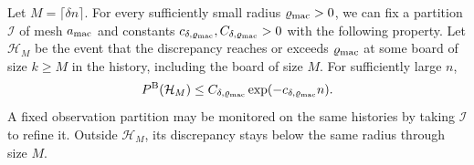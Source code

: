 \begin{proposicion}\label{macro:parada}
Let $M=\lceil\delta n\rceil$. For every sufficiently small radius $\varrho_{\rm mac}>0$, we can fix a
partition $\mathcal I$ of mesh $a_{\rm mac}$ and constants
$c_{\delta,\varrho_{\rm mac}},C_{\delta,\varrho_{\rm mac}}>0$ with the following property.
Let $\mathcal H_M$ be the event that the discrepancy reaches or exceeds $\varrho_{\rm mac}$ at some
board of size ${k\ge M}$ in the history, including the board of size $M$. For sufficiently large $n$,
\[
 P^{\rm B}(\mathcal H_M)\le C_{\delta,\varrho_{\rm mac}}\exp(-c_{\delta,\varrho_{\rm mac}}n).
\]
A fixed observation partition may be monitored on the same histories by taking $\mathcal I$ to
refine it. Outside $\mathcal H_M$, its discrepancy stays below the same radius through size $M$.
\end{proposicion}

